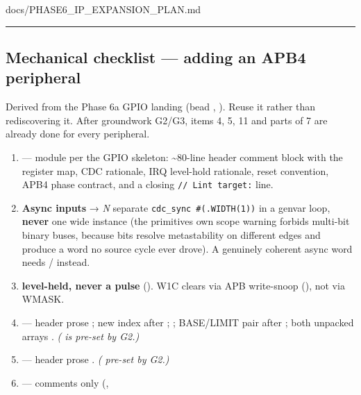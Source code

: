 \begin{relocated}{docs/PHASE6_IP_EXPANSION_PLAN.md}
\begin{center}\rule{0.5\linewidth}{0.5pt}\end{center}

\subsection{Mechanical checklist --- adding an APB4 peripheral}\label{ds:ch:phase6-ip-expansion-plan:10-mechanical-checklist-adding-an-apb4-peripheral}

Derived from the Phase 6a GPIO landing (bead , ).
Reuse it rather than rediscovering it. After groundwork G2/G3, items 4,
5, 11 and parts of 7 are already done for every peripheral.

\begin{enumerate}
\def\labelenumi{\arabic{enumi}.}
\tightlist
\item
  \textbf{} --- module per the GPIO skeleton:
  \textasciitilde80-line header comment block with the register map, CDC
  rationale, IRQ level-hold rationale, reset convention, APB4 phase
  contract, and a closing
  \texttt{/\allowbreak{}/\allowbreak{}\ Lint\ target:\allowbreak{}}
  line.
\item
  \textbf{Async inputs} → \emph{N} separate
  \texttt{cdc\_\allowbreak{}sync\ \#(.\allowbreak{}WIDTH(1))} in a
  genvar loop, \textbf{never} one wide instance (the
  primitive\textquotesingle s own scope warning forbids multi-bit binary
  buses, because bits resolve metastability on different edges and
  produce a word no source cycle ever drove). A genuinely coherent async
  word needs  /  instead.
\item
  \textbf{ level-held, never a pulse}
  (). W1C clears via APB write-snoop
  (), not via WMASK.
\item
  \textbf{} --- header prose
  ; new  index after ;
   ; BASE/\allowbreak{}LIMIT pair after
  ; both unpacked arrays .
  \emph{(  is pre-set by G2.)}
\item
  \textbf{} --- header prose
  . \emph{(  pre-set by G2.)}
\item
  \textbf{} --- comments only (,

\end{enumerate}
\end{relocated}

